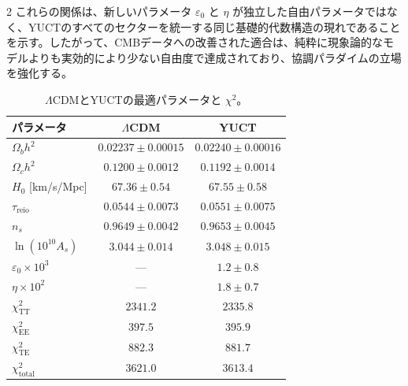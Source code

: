 \documentclass[11pt,a4paper]{article}
\begin{document}
\begin{multicols}{2}
		これらの関係は、新しいパラメータ \(\varepsilon_0\) と \(\eta\) が独立した自由パラメータではなく、YUCTのすべてのセクターを統一する同じ基礎的代数構造の現れであることを示す。したがって、CMBデータへの改善された適合は、純粋に現象論的なモデルよりも実効的により少ない自由度で達成されており、協調パラダイムの立場を強化する。
		
	\end{multicols}
	
	\begin{table}[H]
		\centering
		\caption{\(\Lambda\)CDMとYUCTの最適パラメータと \(\chi^2\)。}
		\label{tab:results}
		\LARGE
		\begin{tabular}{lcc}
			\toprule
			パラメータ & \(\Lambda\)CDM & YUCT \\
			\midrule
			\(\Omega_b h^2\) & \(0.02237 \pm 0.00015\) & \(0.02240 \pm 0.00016\) \\
			\(\Omega_c h^2\) & \(0.1200 \pm 0.0012\) & \(0.1192 \pm 0.0014\) \\
			\(H_0\) [km/s/Mpc] & \(67.36 \pm 0.54\) & \(67.55 \pm 0.58\) \\
			\(\tau_{\mathrm{reio}}\) & \(0.0544 \pm 0.0073\) & \(0.0551 \pm 0.0075\) \\
			\(n_s\) & \(0.9649 \pm 0.0042\) & \(0.9653 \pm 0.0045\) \\
			\(\ln(10^{10}A_s)\) & \(3.044 \pm 0.014\) & \(3.048 \pm 0.015\) \\
			\(\varepsilon_0 \times 10^3\) & — & \(1.2 \pm 0.8\) \\
			\(\eta \times 10^2\) & — & \(1.8 \pm 0.7\) \\
			\midrule
			\(\chi^2_{\mathrm{TT}}\) & \(2341.2\) & \(2335.8\) \\
			\(\chi^2_{\mathrm{EE}}\) & \(397.5\) & \(395.9\) \\
			\(\chi^2_{\mathrm{TE}}\) & \(882.3\) & \(881.7\) \\
			\(\chi^2_{\mathrm{total}}\) & \(3621.0\) & \(3613.4\) \\
			\bottomrule
		\end{tabular}
	\end{table}
	
\end{document}
